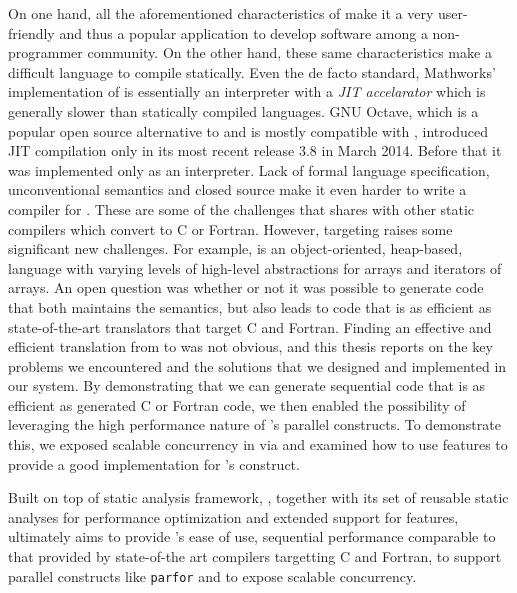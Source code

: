 On one hand, all the aforementioned characteristics of \matlab make it a very
user-friendly and thus a popular application to develop software among a
non-programmer community. On the other hand, these same characteristics make
\matlab a difficult language to compile statically. Even the de facto standard,
Mathworks' implementation of \matlab is essentially an interpreter with a
\emph{JIT accelarator}\cite{matlabjit} which is generally slower than statically
compiled languages. GNU Octave, which is a popular open source alternative to
\matlab and is mostly compatible with \matlab, introduced JIT compilation only
in its most recent release 3.8 in March 2014. Before that it was implemented
only as an interpreter\cite{Octave}.  Lack of formal language specification,
unconventional semantics and closed source make it even harder to write a
compiler for \matlab.  These are some of the challenges that \mixten shares with
other static compilers which convert \matlab to C or Fortran. However, targeting
\xten raises some significant new challenges.   For example, \xten is an
object-oriented,  heap-based, language with varying levels of high-level
abstractions for arrays and iterators of arrays.     An open question was
whether or not it was possible to generate \xten code that both maintains the
\matlab semantics,  but also leads to code that is as efficient as
state-of-the-art translators that target C and Fortran.  Finding an effective
and efficient translation from \matlab to \xten was not obvious, and this thesis
reports on the key problems we encountered and the solutions that we designed
and implemented in our \mixten system.  By demonstrating that we can generate
sequential \xten code that is as efficient as generated C or Fortran code,  we
then enabled the possibility of leveraging the high performance nature of
\xten's parallel constructs.   To demonstrate this, we exposed scalable
concurrency in \matlab via \xten and examined how to use \xten features to
provide a good implementation for \matlab's \parfor construct.

Built on top of \mclab static analysis framework\cite{JesseThesis, TamerPaper},
\mixten, together with its set of reusable static analyses for performance
optimization and extended support for \matlab features, ultimately aims to
provide \matlab's ease of use, sequential performance comparable to that
provided by state-of-the art compilers targetting C and Fortran, to support
parallel constructs like \texttt{parfor} and to expose scalable concurrency.  

